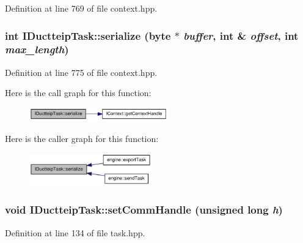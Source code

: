 Definition at line 769 of file context.hpp.\hypertarget{class_i_ductteip_task_a6f946dcbf504460e1a0de2672bcff1c2}{
\subsubsection[{serialize}]{\setlength{\rightskip}{0pt plus 5cm}int IDuctteipTask::serialize ({\bf byte} $\ast$ {\em buffer}, \/  int \& {\em offset}, \/  int {\em max\_\-length})}}
\label{class_i_ductteip_task_a6f946dcbf504460e1a0de2672bcff1c2}


Definition at line 775 of file context.hpp.

Here is the call graph for this function:\nopagebreak
\begin{figure}[H]
\begin{center}
\leavevmode
\includegraphics[width=170pt]{class_i_ductteip_task_a6f946dcbf504460e1a0de2672bcff1c2_cgraph}
\end{center}
\end{figure}


Here is the caller graph for this function:\nopagebreak
\begin{figure}[H]
\begin{center}
\leavevmode
\includegraphics[width=150pt]{class_i_ductteip_task_a6f946dcbf504460e1a0de2672bcff1c2_icgraph}
\end{center}
\end{figure}
\hypertarget{class_i_ductteip_task_ad0ae24379f4794c3363d1e94a1299c03}{
\subsubsection[{setCommHandle}]{\setlength{\rightskip}{0pt plus 5cm}void IDuctteipTask::setCommHandle (unsigned long {\em h})}}
\label{class_i_ductteip_task_ad0ae24379f4794c3363d1e94a1299c03}


Definition at line 134 of file task.hpp.

